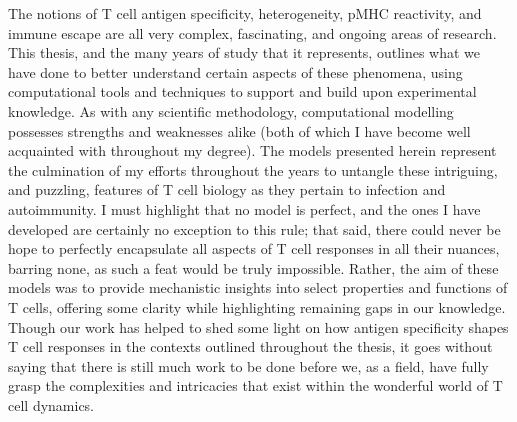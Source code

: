 The notions of T cell antigen specificity, heterogeneity, pMHC reactivity, and immune escape are all very complex, fascinating, and ongoing areas of research. This thesis, and the many years of study that it represents, outlines what we have done to better understand certain aspects of these phenomena, using computational tools and techniques to support and build upon experimental knowledge. As with any scientific methodology, computational modelling possesses strengths and weaknesses alike (both of which I have become well acquainted with throughout my degree). The models presented herein represent the culmination of my efforts throughout the years to untangle these intriguing, and puzzling, features of T cell biology as they pertain to infection and autoimmunity. I must highlight that no model is perfect, and the ones I have developed are certainly no exception to this rule; that said, there could never be hope to perfectly encapsulate all aspects of T cell responses in all their nuances, barring none, as such a feat would be truly impossible. Rather, the aim of these models was to provide mechanistic insights into select properties and functions of T cells, offering some clarity while highlighting remaining gaps in our knowledge. Though our work has helped to shed some light on how antigen specificity shapes T cell responses in the contexts outlined throughout the thesis, it goes without saying that there is still much work to be done before we, as a field, have fully grasp the complexities and intricacies that exist within the wonderful world of T cell dynamics.